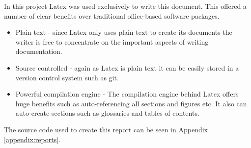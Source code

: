 In this project Latex was used exclusively to write this document. This offered a number of clear benefits over traditional office-based software packages.

\begin{itemize}
	\item Plain text - since Latex only uses plain text to create its documents the writer is free to concentrate on the important aspects of writing documentation.
	\item Source controlled - again as Latex is plain text it can be easily stored in a version control system such as \gls{git}.
	\item Powerful compilation engine - The compilation engine behind Latex offers huge benefits such as auto-referencing all sections and figures etc. It also can auto-create sections such as glossaries and tables of contents.
\end{itemize}

The source code used to create this report can be seen in Appendix \ref{appendix:reports}.
